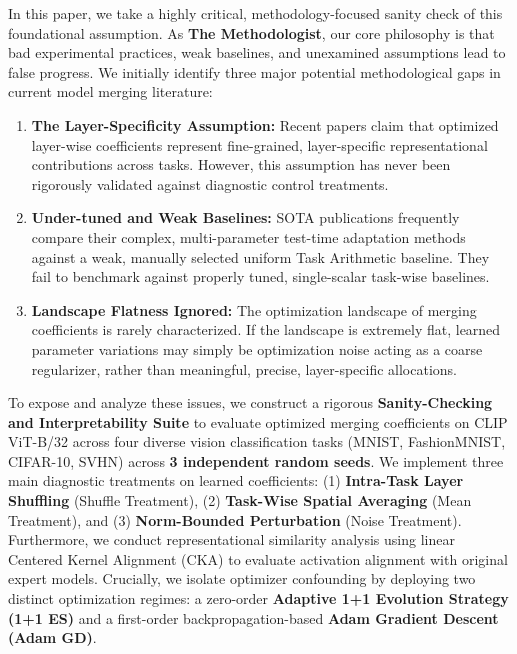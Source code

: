 In this paper, we take a highly critical, methodology-focused sanity check of this foundational assumption. As \textbf{The Methodologist}, our core philosophy is that bad experimental practices, weak baselines, and unexamined assumptions lead to false progress. We initially identify three major potential methodological gaps in current model merging literature:
\begin{enumerate}
    \item \textbf{The Layer-Specificity Assumption:} Recent papers claim that optimized layer-wise coefficients represent fine-grained, layer-specific representational contributions across tasks. However, this assumption has never been rigorously validated against diagnostic control treatments.
    \item \textbf{Under-tuned and Weak Baselines:} SOTA publications frequently compare their complex, multi-parameter test-time adaptation methods against a weak, manually selected uniform Task Arithmetic baseline. They fail to benchmark against properly tuned, single-scalar task-wise baselines.
    \item \textbf{Landscape Flatness Ignored:} The optimization landscape of merging coefficients is rarely characterized. If the landscape is extremely flat, learned parameter variations may simply be optimization noise acting as a coarse regularizer, rather than meaningful, precise, layer-specific allocations.
\end{enumerate}

To expose and analyze these issues, we construct a rigorous \textbf{Sanity-Checking and Interpretability Suite} to evaluate optimized merging coefficients on CLIP ViT-B/32 across four diverse vision classification tasks (MNIST, FashionMNIST, CIFAR-10, SVHN) across \textbf{3 independent random seeds}. We implement three main diagnostic treatments on learned coefficients: (1) \textbf{Intra-Task Layer Shuffling} (Shuffle Treatment), (2) \textbf{Task-Wise Spatial Averaging} (Mean Treatment), and (3) \textbf{Norm-Bounded Perturbation} (Noise Treatment). Furthermore, we conduct representational similarity analysis using linear Centered Kernel Alignment (CKA) \cite{kornblith2019similarity} to evaluate activation alignment with original expert models. Crucially, we isolate optimizer confounding by deploying two distinct optimization regimes: a zero-order \textbf{Adaptive 1+1 Evolution Strategy (1+1 ES)} and a first-order backpropagation-based \textbf{Adam Gradient Descent (Adam GD)}.

